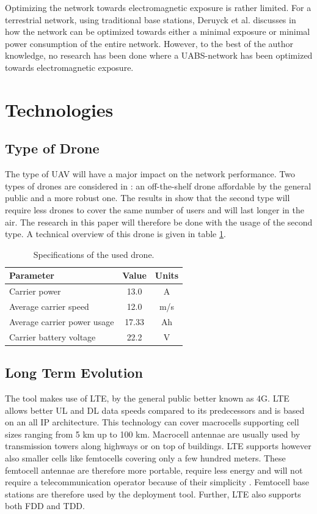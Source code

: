 Optimizing the network towards electromagnetic exposure is rather limited. For a terrestrial network, using traditional base stations,
Deruyck et al. discusses in \cite{J1} how the network can be optimized towards either a minimal exposure or minimal power consumption of the entire network.
However, to the best of the author knowledge, no research has been done where a \gls{UABS}-network has been optimized towards electromagnetic exposure.

\section{Technologies}
\subsection{Type of Drone}
\label{sec:typeofdrone}

The type of \gls{UAV} will have a major impact on the network performance.
Two types of 
drones are considered in \cite{J2}: an off-the-shelf drone affordable by the general public and a more robust one. The results in \cite{J2}
show that the second type will require less drones to cover the same number of users and will last longer in the air. The research in this paper
will therefore be done with the usage of the second type. A technical overview of this drone is given in table \ref{table:dronespecs}.
\newline
\newline
\begin{table}[h!]
\centering
\begin{tabular}{|l|c|c|}
\hline
 Parameter          & Value      & Units   \\    \hline
 Carrier power      & 13.0 &A \\
 Average carrier speed           & 12.0 &m/s       \\ 
 Average carrier power usage    & 17.33& Ah      \\ 
 Carrier battery voltage        & 22.2 &V \\ \hline
\end{tabular}
\caption{Specifications of the used drone.}
\label{table:dronespecs}
\end{table}

\subsection{Long Term Evolution}
The tool makes use of \gls{LTE}, by the general public better known as 4G.  \gls{LTE} allows better \gls{UL} and \gls{DL} data speeds 
compared to its predecessors and is based on an all IP architecture. This technology can cover macrocells supporting cell sizes ranging from 5 km up to 100 km. 
Macrocell antennae are usually used by transmission towers along highways or on top of buildings. LTE supports however also smaller cells like
femtocells covering only a few hundred meters. These femtocell antennae are therefore more portable, require less energy and will not require a telecommunication operator because
of their simplicity \cite{J34}. Femtocell base stations are therefore used by the deployment tool.
Further, \gls{LTE} also supports both \gls{FDD} and \gls{TDD}.

